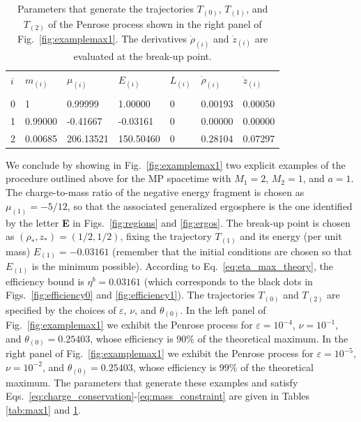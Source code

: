 \renewcommand{\arraystretch}{1.2}
\begin{table}[!htbp]

    \begin{tabular}{lllllll}
        $i$ & $m_{(i)}$ & $\mu_{(i)}$ & $E_{(i)}$ & $L_{(i)}$ & $\dot{\rho}_{(i)}$ & $\dot{z}_{(i)}$ \\ \vspace{-0.3cm} \\
        0   & 1         & 0.99999     & 1.00000   & 0         & 0.00193            & 0.00050         \\
        1   & 0.99000   & -0.41667    & -0.03161  & 0         & 0.00000            & 0.00000         \\
        2   & 0.00685   & 206.13521   & 150.50460 & 0         & 0.28104            & 0.07297         \\
    \end{tabular}

    \caption{Parameters that generate the trajectories $T_{(0)}$, $T_{(1)}$, and $T_{(2)}$ of the Penrose process shown in the right panel of Fig.~\ref{fig:examplemax1}. The derivatives $\dot{\rho}_{(i)}$ and $\dot{z}_{(i)}$ are evaluated at the break-up point.
    }
    \label{tab:max2}
\end{table}

We conclude by showing in Fig.~\ref{fig:examplemax1} two explicit examples of the procedure outlined above for the MP spacetime with $M_1=2$, $M_2=1$, and $a=1$. The charge-to-mass ratio of the negative energy fragment is chosen as $\mu_{(1)}=-5/12$, so that the associated generalized ergosphere is the one identified by the letter \textbf{E} in Figs.~\ref{fig:regions} and \ref{fig:ergos}. The  break-up point is chosen as $(\rho_*,z_*)=(1/2,1/2)$, fixing the trajectory $T_{(1)}$ and its energy (per unit mass) $E_{(1)}=-0.03161$ (remember that the initial conditions are chosen so that $E_{(1)}$ is the minimum possible). According to Eq.~\eqref{eq:eta_max_theory}, the efficiency bound is $\eta^{b} = 0.03161$ (which corresponds to the black dots in Figs.~\ref{fig:efficiency0} and \ref{fig:efficiency1}). The trajectories $T_{(0)}$ and $T_{(2)}$ are specified by the choices of $\varepsilon$, $\nu$, and $\theta_{(0)}$. In the left panel of Fig.~\ref{fig:examplemax1}  we exhibit the Penrose process for $\varepsilon=10^{-4}$, $\nu=10^{-1}$, and $\theta_{(0)}=0.25403$, whose efficiency is $90 \%$ of the theoretical maximum. In the right panel of Fig.~\ref{fig:examplemax1} we exhibit the Penrose process for $\varepsilon=10^{-5}$, $\nu=10^{-2}$, and $\theta_{(0)}=0.25403$, whose efficiency is $99 \%$ of the theoretical maximum.  The parameters that generate these examples and satisfy Eqs.~\eqref{eq:charge_conservation}-\eqref{eq:mass_constraint} are  given in Tables \ref{tab:max1} and \ref{tab:max2}.